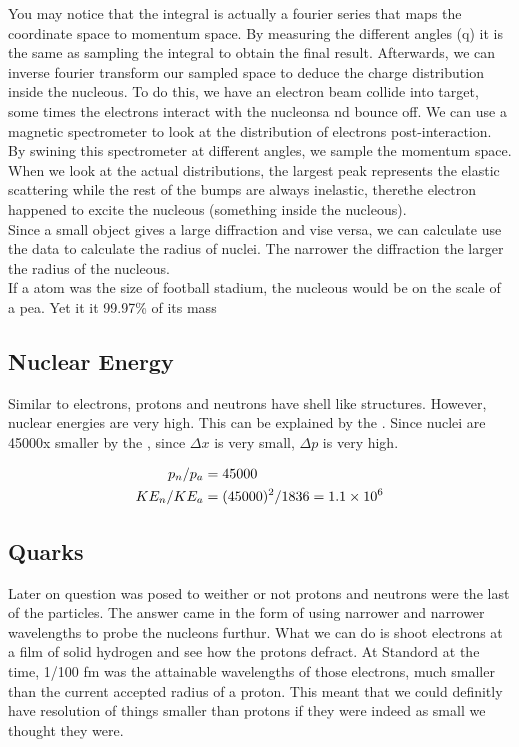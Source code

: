 \documentclass[english, 11pt]{article}
\begin{document}
      You may notice that the integral is actually a fourier series that maps the coordinate space to momentum space. By measuring the different angles (q) it is the same as sampling the integral to obtain the final result. Afterwards, we can inverse fourier transform our sampled space to deduce the charge distribution inside the nucleous. To do this, we have an electron beam collide into target, some times the electrons interact with the nucleonsa nd bounce off. We can use a magnetic spectrometer to look at the distribution of electrons post-interaction. By swining this spectrometer at different angles, we sample the momentum space. \\
      When we look at the actual distributions, the largest peak represents the elastic scattering while the rest of the bumps are always inelastic, therethe electron happened to excite the nucleous (something inside the nucleous).\\
      Since a small object gives a large diffraction and vise versa, we can calculate use the data to calculate the radius of nuclei. The narrower the diffraction the larger the radius of the nucleous.\\
      If a atom was the size of football stadium, the nucleous would be on the scale of a pea. Yet it it 99.97\% of its mass

    \subsection{Nuclear Energy}

    Similar to electrons, protons and neutrons have shell like structures. However, nuclear energies are very high. This can be explained by the . Since nuclei are 45000x smaller by the , since $\Delta x$ is very small, $\Delta p$ is very high. 

    \begin{align*}
      p_n / p_a &= 45000\\
      KE_n / KE_a &= (45000)^2 / 1836 = 1.1\times 10^{6}
    \end{align*}

    \subsection{Quarks}

    Later on question was posed to weither or not protons and neutrons were the last of the particles. The answer came in the form of using narrower and narrower wavelengths to probe the nucleons furthur. What we can do is shoot electrons at a film of solid hydrogen and see how the protons defract. At Standord at the time, 1/100 fm was the attainable wavelengths of those electrons, much smaller than the current accepted radius of a proton. This meant that we could definitly have resolution of things smaller than protons if they were indeed as small we thought they were.\\
\end{document}
